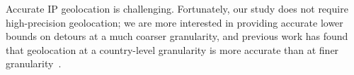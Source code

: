Accurate IP geolocation is challenging.  Fortunately, our study does not require high-precision geolocation; we
are more interested in providing accurate lower bounds on detours at a
much coarser granularity, and previous work has found that
geolocation at a country-level granularity is more accurate than at
finer granularity~\cite{huffaker2011geocompare}. 


